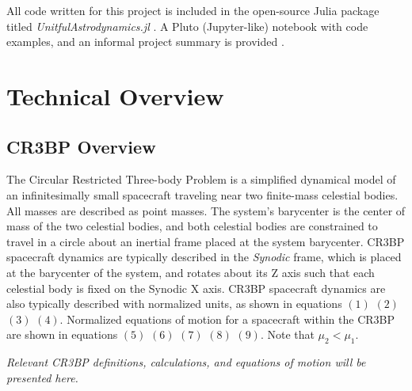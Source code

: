 \documentclass[conf]{new-aiaa}
\begin{document}
\begin{multicols*}{2}
All code written for this project is included in the open-source 
Julia package titled \textit{UnitfulAstrodynamics.jl} \cite{carpinelli2020astro}.
A Pluto (Jupyter-like) notebook with code examples, and an informal 
project summary is provided 
\cite{fosnp2020Pluto} \cite{carpinelli2020halos}.

\section{Technical Overview}

\subsection{CR3BP Overview}
The Circular Restricted Three-body Problem is a simplified 
dynamical model of an infinitesimally small spacecraft traveling
near two finite-mass celestial bodies. All masses are described
as point masses. The system's barycenter is the 
center of mass of the two celestial bodies, and both celestial 
bodies are constrained to travel in a circle about an inertial 
frame placed at the system barycenter. CR3BP spacecraft dynamics are 
typically described in the \textit{Synodic} frame, which is placed
at the barycenter of the system, and rotates about its Z axis such 
that each celestial body is fixed on the Synodic X axis. 
CR3BP spacecraft dynamics are also typically described with 
normalized units,
as shown in equations $\left(1\right)$ $\left(2\right)$ $\left(3\right)$
$\left(4\right)$. Normalized equations of motion for a spacecraft 
within the CR3BP are shown in equations 
$\left(5\right)$ $\left(6\right)$ $\left(7\right)$ $\left(8\right)$
$\left(9\right)$. Note that $\mu_2 < \mu_1$.

\textit{
    Relevant CR3BP definitions, calculations, and 
    equations of motion will be presented here.
}

\end{multicols*}
\end{document}
